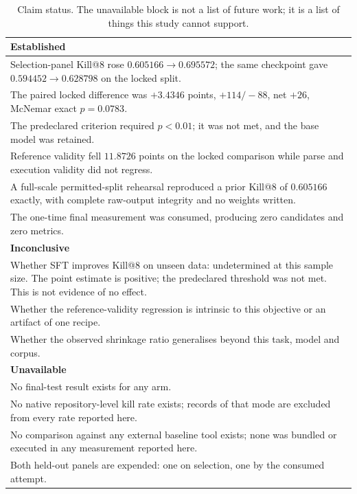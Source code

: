 \documentclass[10pt,conference]{IEEEtran}
\makeatletter
\newcommand{\killk}[1]{Kill@#1}
\makeatother
\begin{document}
\begin{table}[t]
\caption{Claim status. The unavailable block is not a list of future work; it
is a list of things this study cannot support.}
\label{tab:claims}
\centering
\footnotesize
\begin{tabular}{@{}p{}@{}}
\toprule
\textbf{Established} \\
\midrule
Selection-panel \killk{8} rose $0.605166 \to 0.695572$; the same checkpoint gave
$0.594452 \to 0.628798$ on the locked split. \\
The paired locked difference was $+3.4346$ points, $+114/-88$, net $+26$,
McNemar exact $p = 0.0783$. \\
The predeclared criterion required $p < 0.01$; it was not met, and the base
model was retained. \\
Reference validity fell $11.8726$ points on the locked comparison while parse
and execution validity did not regress. \\
A full-scale permitted-split rehearsal reproduced a prior \killk{8} of
$0.605166$ exactly, with complete raw-output integrity and no weights written. \\
The one-time final measurement was consumed, producing zero candidates and zero
metrics. \\
\midrule
\textbf{Inconclusive} \\
\midrule
Whether SFT improves \killk{8} on unseen data: undetermined at this sample size.
The point estimate is positive; the predeclared threshold was not met. This is
not evidence of no effect. \\
Whether the reference-validity regression is intrinsic to this objective or an
artifact of one recipe. \\
Whether the observed shrinkage ratio generalises beyond this task, model and
corpus. \\
\midrule
\textbf{Unavailable} \\
\midrule
No final-test result exists for any arm. \\
No native repository-level kill rate exists; records of that mode are excluded
from every rate reported here. \\
No comparison against any external baseline tool exists; none was bundled or
executed in any measurement reported here. \\
Both held-out panels are expended: one on selection, one by the consumed
attempt. \\
\bottomrule
\end{tabular}
\end{table}
\end{document}
